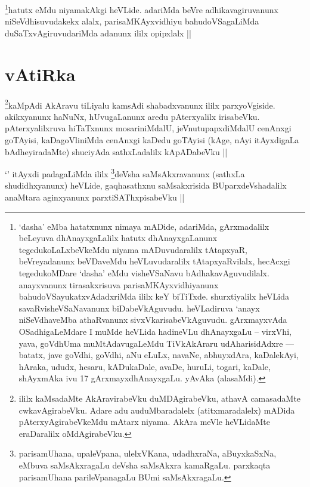 \begin{artha}
\footnote{`dasha' eMba hatatxnunx nimaya mADide, adariMda, gArxmadalilx beLeyuva dhAnayxgaLalilx hatutx dhAnayxgaLanunx tegedukoLaLxbeVkeMdu niyama mADuvudaralilx tAtapxyaR, beVreyadanunx beVDaveMdu heVLuvudaralilx tAtapxyaRvilalx, hecAcxgi tegedukoMDare `dasha' eMdu visheVSaNavu bAdhakavAguvudilalx. anayxvanunx tirasakxrisuva parisaMKAyxvidhiyanunx bahudoVSayukatxvAdadxriMda ililx keY biTiTxde. shurxtiyalilx heVLida savaRvisheVSaNavanunx biDabeVkAguvudu. heVLadiruva `anayx niSeVdhaveMba athaRvanunx sivxVkarisabeVkAguvudu. gArxmayxvAda OSadhigaLeMdare I muMde heVLida hadineVLu dhAnayxgaLu -- virxVhi, yava, goVdhUma muMtAdavugaLeMdu TiVkAkAraru udAharisidAdxre --- \stext batatx, jave goVdhi, goVdhi, aNu eLuLx, navaNe, abhuyxdAra, kaDalekAyi, hAraka, ududx, hesaru, kADukaDale, avaDe, huruLi, togari, kaDale, shAyxmAka ivu 17 gArxmayxdhAnayxgaLu. yAvAka (alasaMdi).}hatutx eMdu niyamakAkgi heVLide. adariMda beVre adhikavagiruvanunx niSeVdhisuvudakekx alalx, parisaMKAyxvidhiyu bahudoVSagaLiMda duSaTxvAgiruvudariMda adanunx ililx opipxlalx ||
\end{artha}

\section*{vAtiRka}


\begin{artha}
\footnote{ililx kaMsadaMte AkAravirabeVku duMDAgirabeVku, athavA camasadaMte cwkavAgirabeVku. Adare adu auduMbaradalelx (atitxmaradalelx) mADida pAterxyAgirabeVkeMdu mAtarx niyama. AkAra meVle heVLidaMte eraDaralilx oMdAgirabeVku.}kaMpAdi AkAravu tiLiyalu kamsAdi shabadxvanunx ililx parxyoVgiside. akikxyanunx haNuNx, hUvugaLanunx aredu pAterxyalilx irisabeVku. pAterxyalilxruva hiTaTxnunx mosariniMdalU, jeVnutupapxdiMdalU cenAnxgi goTAyisi, kaDagoVliniMda cenAnxgi kaDedu goTAyisi (kAge, nAyi itAyxdigaLa bAdheyiradaMte) shuciyAda sathxLadalilx kApADabeVku ||
\end{artha}


\begin{artha}
`\stext' itAyxdi padagaLiMda ililx \footnote{parisamUhana, upaleVpana, ulelxVKana, udadhxraNa, aBuyxkaSxNa, eMbuva saMsAkxragaLu deVsha saMsAkxra kamaRgaLu. parxkaqta parisamUhana parileVpanagaLu BUmi saMsAkxragaLu.}deVsha saMsAkxravanunx (sathxLa shudidhxyanunx) heVLide, gaqhasathxnu saMsakxrisida BUparxdeVshadalilx anaMtara aginxyanunx parxtiSAThxpisabeVku ||
\end{artha}

